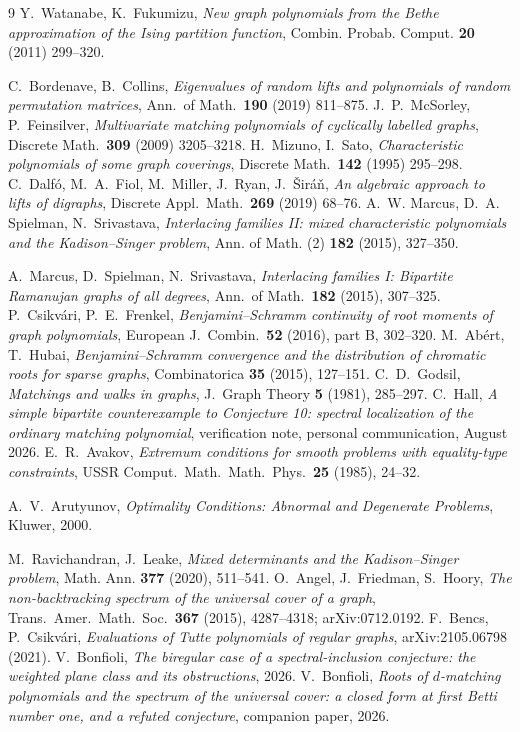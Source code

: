 \documentclass[11pt]{article}
\theoremstyle{remark}
\begin{document}
\begin{thebibliography}{9}
 Y.~Watanabe, K.~Fukumizu, \emph{New graph polynomials from the Bethe
approximation of the Ising partition function}, Combin. Probab. Comput.
\textbf{20} (2011) 299--320.

 C.~Bordenave, B.~Collins, \emph{Eigenvalues of random lifts and
polynomials of random permutation matrices}, Ann.\ of Math.\ \textbf{190}
(2019) 811--875.
 J.~P.~McSorley, P.~Feinsilver, \emph{Multivariate matching
polynomials of cyclically labelled graphs}, Discrete Math.\ \textbf{309} (2009)
3205--3218.
 H.~Mizuno, I.~Sato, \emph{Characteristic polynomials of some graph
coverings}, Discrete Math.\ \textbf{142} (1995) 295--298.
 C.~Dalf\'o, M.~A.~Fiol, M.~Miller, J.~Ryan, J.~\v{S}ir\'a\v{n},
\emph{An algebraic approach to lifts of digraphs}, Discrete Appl.\ Math.\
\textbf{269} (2019) 68--76.
 A.~W. Marcus, D.~A. Spielman, N.~Srivastava,
\emph{Interlacing families II: mixed characteristic polynomials and the Kadison--Singer
problem}, Ann. of Math. (2) \textbf{182} (2015), 327--350.

 A.~Marcus, D.~Spielman, N.~Srivastava, \emph{Interlacing
families I: Bipartite Ramanujan graphs of all degrees}, Ann.\ of Math.\
\textbf{182} (2015), 307--325.
\bibitem{CsF} P.~Csikv\'ari, P.~E.~Frenkel, \emph{Benjamini--Schramm continuity
of root moments of graph polynomials}, European J.\ Combin.\ \textbf{52} (2016),
part B, 302--320.
\bibitem{AH} M.~Ab\'ert, T.~Hubai, \emph{Benjamini--Schramm convergence and the
distribution of chromatic roots for sparse graphs}, Combinatorica \textbf{35}
(2015), 127--151.
\bibitem{Go} C.~D.~Godsil, \emph{Matchings and walks in graphs}, J.\ Graph
Theory \textbf{5} (1981), 285--297.
\bibitem{HallCE} C.~Hall, \emph{A simple bipartite counterexample to Conjecture 10:
  spectral localization of the ordinary matching polynomial}, verification note, personal
  communication, August 2026.
\bibitem{Avakov} E.~R.~Avakov, \emph{Extremum conditions for smooth problems with
equality-type constraints}, USSR Comput.\ Math.\ Math.\ Phys.\ \textbf{25} (1985), 24--32.

\bibitem{Arutyunov} A.~V.~Arutyunov, \emph{Optimality Conditions: Abnormal and Degenerate
Problems}, Kluwer, 2000.

 M.~Ravichandran, J.~Leake, \emph{Mixed determinants and the Kadison--Singer
  problem}, Math. Ann. \textbf{377} (2020), 511--541.
\bibitem{AFH} O.~Angel, J.~Friedman, S.~Hoory, \emph{The non-backtracking spectrum of the
  universal cover of a graph}, Trans.\ Amer.\ Math.\ Soc.\ \textbf{367} (2015), 4287--4318;
  arXiv:0712.0192.
\bibitem{BCs} F.~Bencs, P.~Csikv\'ari, \emph{Evaluations of Tutte polynomials of
regular graphs}, arXiv:2105.06798 (2021).
\bibitem{PartII} V.~Bonfioli, \emph{The biregular case of a spectral-inclusion conjecture:
  the weighted plane class and its obstructions}, 2026.
\bibitem{PartI} V.~Bonfioli, \emph{Roots of $d$-matching polynomials and the spectrum of
  the universal cover: a closed form at first Betti number one, and a refuted conjecture},
  companion paper, 2026.
\end{thebibliography}
\end{document}
